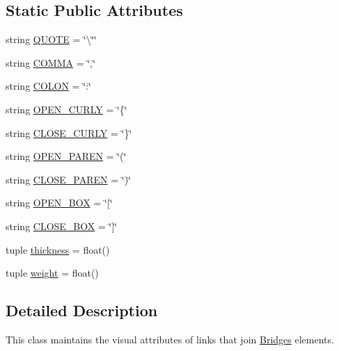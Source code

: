 \subsection*{Static Public Attributes}
\begin{DoxyCompactItemize}
\item 
string \hyperlink{class_link_visualizer_1_1_link_visualizer_a595bb37530287561ffcf304343f7cbde}{Q\+U\+O\+T\+E} = \char`\"{}\textbackslash{}\char`\"{}\char`\"{}
\item 
string \hyperlink{class_link_visualizer_1_1_link_visualizer_ad224a39d19962af54d0726969daa2de2}{C\+O\+M\+M\+A} = \char`\"{},\char`\"{}
\item 
string \hyperlink{class_link_visualizer_1_1_link_visualizer_a179dcb192b99a210729db42add346470}{C\+O\+L\+O\+N} = \char`\"{}\+:\char`\"{}
\item 
string \hyperlink{class_link_visualizer_1_1_link_visualizer_a950cd3c24de95491a53c5cdbd4813a90}{O\+P\+E\+N\+\_\+\+C\+U\+R\+L\+Y} = \char`\"{}\{\char`\"{}
\item 
string \hyperlink{class_link_visualizer_1_1_link_visualizer_a32ff73aa930e9c4a76d26912eb0b6fc9}{C\+L\+O\+S\+E\+\_\+\+C\+U\+R\+L\+Y} = \char`\"{}\}\char`\"{}
\item 
string \hyperlink{class_link_visualizer_1_1_link_visualizer_a0c22a31e997863f6cbdb4507ca5eae4a}{O\+P\+E\+N\+\_\+\+P\+A\+R\+E\+N} = \char`\"{}(\char`\"{}
\item 
string \hyperlink{class_link_visualizer_1_1_link_visualizer_a87bf59ceee60cb2820d9fa5f87d8accb}{C\+L\+O\+S\+E\+\_\+\+P\+A\+R\+E\+N} = \char`\"{})\char`\"{}
\item 
string \hyperlink{class_link_visualizer_1_1_link_visualizer_aba39bf04f99a352408ea57a73fccead8}{O\+P\+E\+N\+\_\+\+B\+O\+X} = \char`\"{}\mbox{[}\char`\"{}
\item 
string \hyperlink{class_link_visualizer_1_1_link_visualizer_a53eecc0f75db3bc4f80fd3043371364f}{C\+L\+O\+S\+E\+\_\+\+B\+O\+X} = \char`\"{}\mbox{]}\char`\"{}
\item 
tuple \hyperlink{class_link_visualizer_1_1_link_visualizer_accc3a152b5d7e227803b8dfd80082ff2}{thickness} = float()
\item 
tuple \hyperlink{class_link_visualizer_1_1_link_visualizer_a2bcaeacc143bd2629d2fc7849b895bde}{weight} = float()
\end{DoxyCompactItemize}


\subsection{Detailed Description}
This class maintains the visual attributes of links that join \hyperlink{namespace_bridges}{Bridges} elements. 

